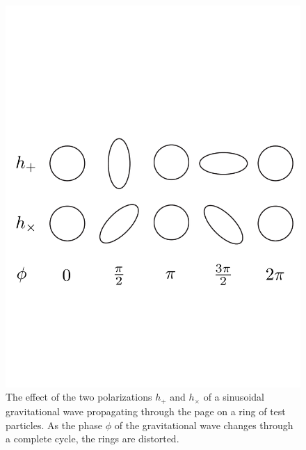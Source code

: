 \begin{figure}[p]
\label{f:rings}
\begin{center}
\includegraphics[width=\linewidth]{figures/inspiral/rings}
\end{center}
\caption[Effect of a Gravitational Wave Polarizations on a Ring of Particles]{%
The effect of the two polarizations $h_+$ and $h_\times$ of a sinusoidal
gravitational wave propagating through the page on a ring of test particles.
As the phase $\phi$ of the gravitational wave changes through a complete
cycle, the rings are distorted.
}
\end{figure}


